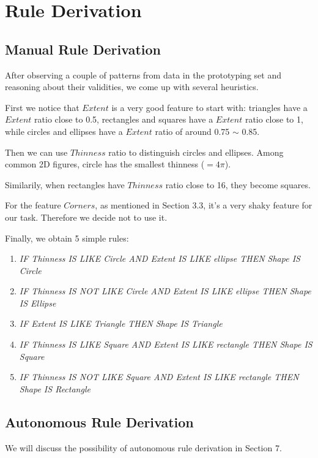 \section{Rule Derivation}

\subsection{Manual Rule Derivation}

After observing a couple of patterns from data in the prototyping set and reasoning about their validities, we come up with several heuristics.

First we notice that $Extent$ is a very good feature to start with: triangles have a $Extent$ ratio close to 0.5, rectangles and squares have a $Extent$ ratio close to 1, while circles and ellipses have a $Extent$ ratio of around 0.75 $\sim$ 0.85.

Then we can use $Thinness$ ratio to distinguish circles and ellipses. Among common 2D figures, circle has the smallest thinness ($=4\pi$).

Similarily, when rectangles have $Thinness$ ratio close to 16, they become squares.

For the feature $Corners$, as mentioned in Section 3.3, it's a very shaky feature for our task. Therefore we decide not to use it.

Finally, we obtain 5 simple rules:

\begin{enumerate}

\item \textit{IF Thinness IS LIKE Circle AND Extent IS LIKE ellipse THEN Shape IS Circle}
\item \textit{IF Thinness IS NOT LIKE Circle AND Extent IS LIKE ellipse THEN Shape IS Ellipse}
\item \textit{IF Extent IS LIKE Triangle THEN Shape IS Triangle}
\item \textit{IF Thinness IS LIKE Square AND Extent IS LIKE rectangle THEN Shape IS Square}
\item \textit{IF Thinness IS NOT LIKE Square AND Extent IS LIKE rectangle THEN Shape IS Rectangle}

\end{enumerate}

\subsection{Autonomous Rule Derivation}

We will discuss the possibility of autonomous rule derivation in Section 7.